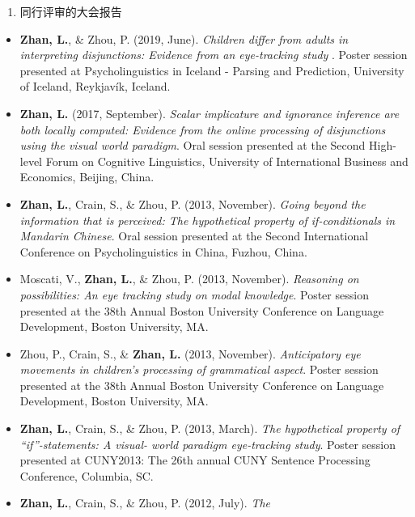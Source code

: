 \documentclass[12pt,]{article}
\providecommand{\tightlist}{%
  \setlength{\itemsep}{0pt}\setlength{\parskip}{0pt}}
\begin{document}
\begin{enumerate}
\def\labelenumi{\arabic{enumi}.}
\setcounter{enumi}{3}
\tightlist
\item
  同行评审的大会报告
\end{enumerate}

\begin{itemize}
\item
  \textbf{Zhan, L.}, \& Zhou, P. (2019, June). \emph{Children differ
  from adults in interpreting disjunctions: Evidence from an
  eye-tracking study }. Poster session presented at Psycholinguistics in
  Iceland - Parsing and Prediction, University of Iceland, Reykjavík,
  Iceland. \href{https://publications.likan.info/Talks/PIPP_Poster.pdf}{
  \faFilePdf[regular] }
\item
  \textbf{Zhan, L.} (2017, September). \emph{Scalar implicature and
  ignorance inference are both locally computed: Evidence from the
  online processing of disjunctions using the visual world paradigm}.
  Oral session presented at the Second High-level Forum on Cognitive
  Linguistics, University of International Business and Economics,
  Beijing, China.
  \href{https://publications.likan.info/Talks/ZhanL2017UIBE.pdf}{
  \faFilePdf[regular] }
\item
  \textbf{Zhan, L.}, Crain, S., \& Zhou, P. (2013, November).
  \emph{Going beyond the information that is perceived: The hypothetical
  property of if-conditionals in Mandarin Chinese}. Oral session
  presented at the Second International Conference on Psycholinguistics
  in China, Fuzhou, China.
\item
  Moscati, V., \textbf{Zhan, L.}, \& Zhou, P. (2013, November).
  \emph{Reasoning on possibilities: An eye tracking study on modal
  knowledge}. Poster session presented at the 38th Annual Boston
  University Conference on Language Development, Boston University, MA.
\item
  Zhou, P., Crain, S., \& \textbf{Zhan, L.} (2013, November).
  \emph{Anticipatory eye movements in children's processing of
  grammatical aspect}. Poster session presented at the 38th Annual
  Boston University Conference on Language Development, Boston
  University, MA.
\item
  \textbf{Zhan, L.}, Crain, S., \& Zhou, P. (2013, March). \emph{The
  hypothetical property of ``if''-statements: A visual- world paradigm
  eye-tracking study}. Poster session presented at CUNY2013: The 26th
  annual CUNY Sentence Processing Conference, Columbia, SC.
\item
  \textbf{Zhan, L.}, Crain, S., \& Zhou, P. (2012, July). \emph{The
}
\end{itemize}
\end{document}
